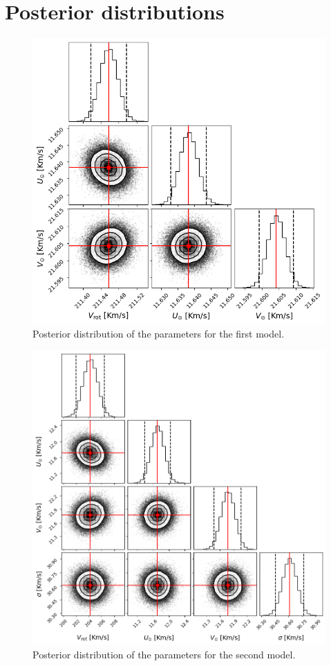 \newpage
\appendix

\section{Posterior distributions}\label{Appendix:PosteriorDistributions}

\begin{figure}[h]
    \centering
    \includegraphics[width = 0.8\linewidth]{Fig/PosteriorSimple.png}
    \caption{Posterior distribution of the parameters for the first model.}\label{fig:PosteriorSimple}
\end{figure}

\begin{figure}[h]
    \centering
    \includegraphics[width = 0.8\linewidth]{Fig/PosteriorFull.png}
    \caption{Posterior distribution of the parameters for the second model.}\label{fig:PosteriorFull}
\end{figure}